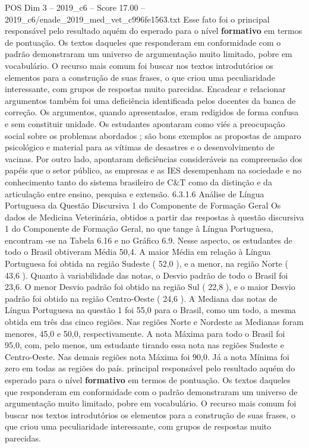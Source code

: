 \begin{textsample}{POS Dim 3 – 2019\_c6 – Score 17.00 – 2019\_c6/enade\_2019\_med\_vet\_c996fe1563.txt}
Esse fato foi o principal responsável pelo resultado aquém do esperado para o nível \textbf{formativo} em termos de pontuação.
Os textos daqueles que responderam em conformidade com o padrão demonstraram um universo de argumentação muito limitado, pobre em vocabulário.
O recurso mais comum foi buscar nos textos introdutórios os elementos para a construção de suas frases, o que criou uma peculiaridade interessante, com grupos de respostas muito parecidas.
Encadear e relacionar argumentos também foi uma deficiência identificada pelos docentes da banca de correção.
Os argumentos, quando apresentados, eram redigidos de forma confusa e sem constituir unidade.
Os estudantes apontaram como viés a preocupação social sobre os problemas abordados ; são bons exemplos as propostas de amparo psicológico e material para as vítimas de desastres e o desenvolvimento de vacinas.
Por outro lado, apontaram deficiências consideráveis na compreensão dos papéis que o setor público, as empresas e as IES desempenham na sociedade e no conhecimento tanto do sistema brasileiro de C\&T como da distinção e da articulação entre ensino, pesquisa e extensão. 6.3.1.6 Análise de Língua Portuguesa da Questão Discursiva 1 do Componente de Formação Geral Os dados de Medicina Veterinária, obtidos a partir das respostas à questão discursiva 1 do Componente de Formação Geral, no que tange à Língua Portuguesa, encontram -se na Tabela 6.16 e no Gráfico 6.9.
Nesse aspecto, os estudantes de todo o Brasil obtiveram Média 50,4.
A maior Média em relação à Língua Portuguesa foi obtida na região Sudeste ( 52,0 ), e a menor, na região Norte ( 43,6 ).
Quanto à variabilidade das notas, o Desvio padrão de todo o Brasil foi 23,6.
O menor Desvio padrão foi obtido na região Sul ( 22,8 ), e o maior Desvio padrão foi obtido na região Centro-Oeste ( 24,6 ).
A Mediana das notas de Língua Portuguesa na questão 1 foi 55,0 para o Brasil, como um todo, a mesma obtida em três das cinco regiões.
Nas regiões Norte e Nordeste as Medianas foram menores, 45,0 e 50,0, respectivamente.
A nota Máxima para todo o Brasil foi 95,0, com, pelo menos, um estudante tirando essa nota nas regiões Sudeste e Centro-Oeste.
Nas demais regiões nota Máxima foi 90,0.
Já a nota Mínima foi zero em todas as regiões do país. principal responsável pelo resultado aquém do esperado para o nível \textbf{formativo} em termos de pontuação.
Os textos daqueles que responderam em conformidade com o padrão demonstraram um universo de argumentação muito limitado, pobre em vocabulário.
O recurso mais comum foi buscar nos textos introdutórios os elementos para a construção de suas frases, o que criou uma peculiaridade interessante, com grupos de respostas muito parecidas.

\end{textsample}
